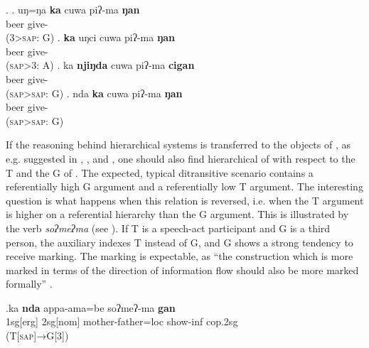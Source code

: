 \ex. \ag.  uŋ=ŋa {\bf ka} cuwa piʔ-ma {\bf ŋan}\\
    beer\sc{}  give- \\
 (3>\textsc{sap}: G) 
\bg. {\bf ka} uŋci cuwa  piʔ-ma {\bf ŋan}\\
  beer\sc{}  give- \\
 (\textsc{sap}>3: A)
\bg. ka {\bf njiŋda} cuwa piʔ-ma {\bf cigan}\\
  beer\sc{} give- \\ 
	(\textsc{sap}>\textsc{sap}: G)
\bg. nda {\bf ka} cuwa piʔ-ma {\bf ŋan}\\
  beer\sc{} give- \\ 
	(\textsc{sap}>\textsc{sap}: G)


If the reasoning behind hierarchical  systems is transferred to the objects of , as e.g. suggested in \citet{Haspelmath2004Explaining}, \citet{Malchukovetal2010Ditrans-overview}, and \citet{ Siewierska2003Person}, one should also find hierarchical  of  with respect to the T and the G of . The expected, typical ditransitive scenario contains a referentially high G argument and a referentially low T argument. The interesting question is what happens when this relation is reversed, i.e. when the T argument is higher on a referential hierarchy than the G argument. This is illustrated by the verb \emph{soʔmeʔma}   (see \Next). If T is a speech-act participant  and G is a third person, the auxiliary indexes T instead of G, and G shows a strong tendency to receive   marking. The   marking is expectable, as “the construction which is more marked in terms of the direction of information flow should also be more marked formally” \citep[128]{Comrie1989Language}. 

\exg.ka \textbf{nda} appa-ama=be soʔmeʔ-ma \textbf{gan}\\
		 {\sc 1sg[erg]}  {\sc 2sg[nom]}  mother-father{\sc =loc} show{\sc -inf} {\sc cop.2sg}\\
		 (T[\textsc{sap}]→G[3])
		


